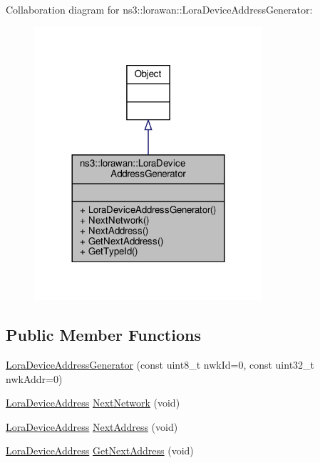 Collaboration diagram for ns3\+:\+:lorawan\+:\+:Lora\+Device\+Address\+Generator\+:
\nopagebreak
\begin{figure}[H]
\begin{center}
\leavevmode
\includegraphics[width=240pt]{classns3_1_1lorawan_1_1LoraDeviceAddressGenerator__coll__graph}
\end{center}
\end{figure}
\subsection*{Public Member Functions}
\begin{DoxyCompactItemize}
\item 
\hyperlink{classns3_1_1lorawan_1_1LoraDeviceAddressGenerator_afb0a91944592c3f390c528bc4a87574d}{Lora\+Device\+Address\+Generator} (const uint8\+\_\+t nwk\+Id=0, const uint32\+\_\+t nwk\+Addr=0)
\item 
\hyperlink{classns3_1_1lorawan_1_1LoraDeviceAddress}{Lora\+Device\+Address} \hyperlink{classns3_1_1lorawan_1_1LoraDeviceAddressGenerator_a2d166ee5b76365d6a7a31cac36817f60}{Next\+Network} (void)
\item 
\hyperlink{classns3_1_1lorawan_1_1LoraDeviceAddress}{Lora\+Device\+Address} \hyperlink{classns3_1_1lorawan_1_1LoraDeviceAddressGenerator_a1d6c7015540abd13289e69dfcd0f6701}{Next\+Address} (void)
\item 
\hyperlink{classns3_1_1lorawan_1_1LoraDeviceAddress}{Lora\+Device\+Address} \hyperlink{classns3_1_1lorawan_1_1LoraDeviceAddressGenerator_aded9a1ced7deb2449cfcd07291bc4281}{Get\+Next\+Address} (void)
\end{DoxyCompactItemize}
